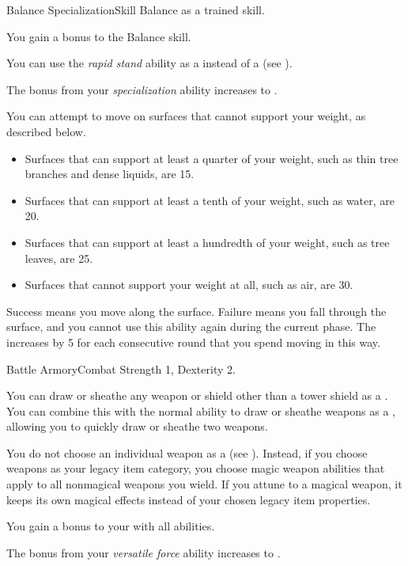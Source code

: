     \begin{feat}{Balance Specialization}{Skill}
        \featpre Balance as a trained skill.

         You gain a  bonus to the Balance skill.

         You can use the \textit{rapid stand} ability as a  instead of a  (see ).

         The bonus from your \textit{specialization} ability increases to .

         You can attempt to move on surfaces that cannot support your weight, as described below.
        \begin{itemize}
            \item Surfaces that can support at least a quarter of your weight, such as thin tree branches and dense liquids, are  15.
            \item Surfaces that can support at least a tenth of your weight, such as water, are  20.
            \item Surfaces that can support at least a hundredth of your weight, such as tree leaves, are  25.
            \item Surfaces that cannot support your weight at all, such as air, are  30.
        \end{itemize}

        Success means you move along the surface.
        Failure means you fall through the surface, and you cannot use this ability again during the current phase.
        The  increases by 5 for each consecutive round that you spend moving in this way.
    \end{feat}

    \begin{feat}{Battle Armory}{Combat}
        \featpre Strength 1, Dexterity 2.

         You can draw or sheathe any weapon or shield other than a tower shield as a .
        You can combine this with the normal ability to draw or sheathe weapons as a , allowing you to quickly draw or sheathe two weapons.

         You do not choose an individual weapon as a  (see ).
        Instead, if you choose weapons as your legacy item category, you choose magic weapon abilities that apply to all nonmagical weapons you wield.
        If you attune to a magical weapon, it keeps its own magical effects instead of your chosen legacy item properties.

         You gain a  bonus to your  with all abilities.

         The bonus from your \textit{versatile force} ability increases to .
    \end{feat}

